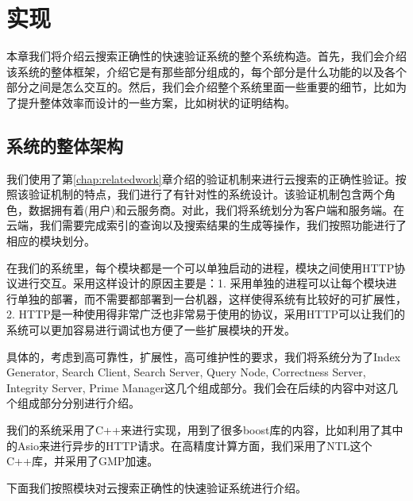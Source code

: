 \chapter{实现}
\label{chap:implementation}

本章我们将介绍云搜索正确性的快速验证系统的整个系统构造。首先，我们会介绍该系统的整体框架，介绍它是有那些部分组成的，每个部分是什么功能的以及各个部分之间是怎么交互的。然后，我们会介绍整个系统里面一些重要的细节，比如为了提升整体效率而设计的一些方案，比如树状的证明结构。

\section{系统的整体架构}

我们使用了第\ref{chap:relatedwork}章介绍的验证机制来进行云搜索的正确性验证。按照该验证机制的特点，我们进行了有针对性的系统设计。该验证机制包含两个角色，数据拥有着(用户)和云服务商。对此，我们将系统划分为客户端和服务端。在云端，我们需要完成索引的查询以及搜索结果的生成等操作，我们按照功能进行了相应的模块划分。

在我们的系统里，每个模块都是一个可以单独启动的进程，模块之间使用HTTP协议进行交互。采用这样设计的原因主要是：1. 采用单独的进程可以让每个模块进行单独的部署，而不需要都部署到一台机器，这样使得系统有比较好的可扩展性，2. HTTP是一种使用得非常广泛也非常易于使用的协议，采用HTTP可以让我们的系统可以更加容易进行调试也方便了一些扩展模块的开发。

具体的，考虑到高可靠性，扩展性，高可维护性的要求，我们将系统分为了Index Generator, Search Client, Search Server, Query Node, Correctness Server, Integrity Server, Prime Manager这几个组成部分。我们会在后续的内容中对这几个组成部分分别进行介绍。

我们的系统采用了C++来进行实现，用到了很多boost库的内容，比如利用了其中的Asio来进行异步的HTTP请求。在高精度计算方面，我们采用了NTL这个C++库，并采用了GMP加速。

下面我们按照模块对云搜索正确性的快速验证系统进行介绍。


